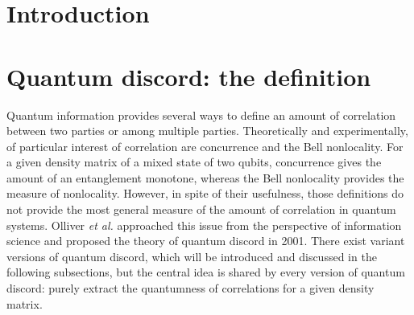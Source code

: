 \documentclass[%
 reprint,
 amsmath,amssymb,
 aps,
]{revtex4-1}
\begin{document}

\section{Introduction}
\noindent \lipsum[1-2]

\section{Quantum discord: the definition}
\noindent Quantum information provides several ways to define an amount of correlation between two parties or among multiple parties. Theoretically and experimentally, of particular interest of correlation are concurrence and the Bell nonlocality. For a given density matrix of a mixed state of two qubits, concurrence gives the amount of an entanglement monotone, whereas the Bell nonlocality provides the measure of nonlocality. However, in spite of their usefulness, those definitions do not provide the most general measure of the amount of correlation in quantum systems. Olliver \textit{et al.} approached this issue from the perspective of information science and proposed the theory of quantum discord in 2001. There exist variant versions of quantum discord, which will be introduced and discussed in the following subsections, but the central idea is shared by every version of quantum discord: purely extract the quantumness of correlations for a given density matrix. 
\end{document}
